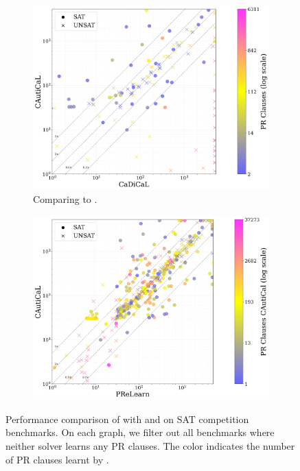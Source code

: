 \begin{figure}[!t]
    \centering
    \begin{subfigure}[t]{0.45\textwidth}
        \centering
        \includegraphics[width=\textwidth]{figs/cadical_vs_cautical_nontrivial.jpg}
        \caption{Comparing \tool to \cadical.}
        \label{subfig:cautical-vs-cadical-satcomp}
    \end{subfigure}
    \hspace{0.06\textwidth}
    \begin{subfigure}[t]{0.45\textwidth}
        \centering
        \includegraphics[width=\textwidth]{figs/prelearn_vs_cautical_nontrivial.jpg}
        \label{subfig:cautical-vs-prelearn-performance}
    \end{subfigure}
    \caption{Performance comparison of \tool with \prelearn and \cadical on SAT competition benchmarks. On each graph, we filter out all benchmarks where neither solver learns any PR clauses. The color indicates the number of PR clauses learnt by \tool.}
    \label{fig:solver-comparison}
\end{figure}

